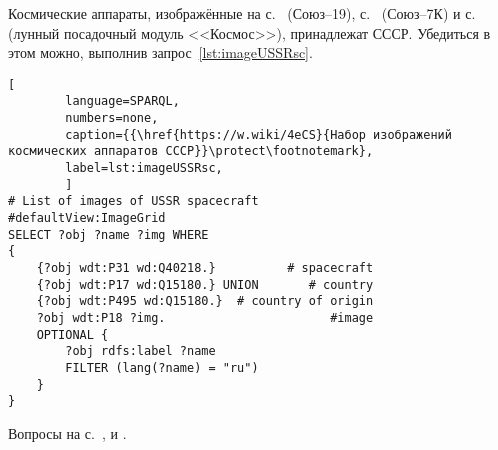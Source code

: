 \hfil{}\hfil%

\begin{task}
    \label{answer:spacecraft_USSR}
    Космические аппараты, 
    изображённые на с.~\pageref{question:spacecraft_soyuz19} (Союз--19), 
    с.~\pageref{question:spacecraft_soyuzT} (Союз--7К) и с.~\pageref{question:spacecraft_lunar} 
    (лунный посадочный модуль <<Космос>>), принадлежат СССР. 
    Убедиться в этом можно, выполнив запрос~\ref{lst:imageUSSRsc}.

    \begin{lstlisting}[ 
        language=SPARQL, 
        numbers=none, 
        caption={{\href{https://w.wiki/4eCS}{Набор изображений космических аппаратов СССР}}\protect\footnotemark}, 
        label=lst:imageUSSRsc, 
        ]
# List of images of USSR spacecraft
#defaultView:ImageGrid
SELECT ?obj ?name ?img WHERE
{
    {?obj wdt:P31 wd:Q40218.}          # spacecraft
    {?obj wdt:P17 wd:Q15180.} UNION       # country
    {?obj wdt:P495 wd:Q15180.}  # country of origin
    ?obj wdt:P18 ?img.                       #image
    OPTIONAL {
		?obj rdfs:label ?name 
		FILTER (lang(?name) = "ru")
	}
}\end{lstlisting}

\small{Вопросы на с.~\pageref{question:spacecraft_soyuz19}, 
    \pageref{question:spacecraft_soyuzT} и \pageref{question:spacecraft_lunar}.}
\end{task}



